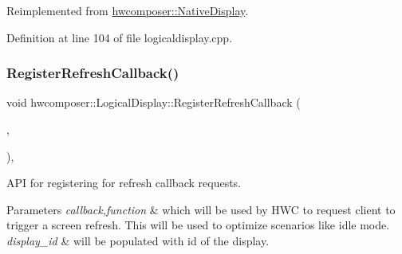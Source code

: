 Reimplemented from \mbox{\hyperlink{classhwcomposer_1_1NativeDisplay_a4080879c203571d6404ba3b3aff53631}{hwcomposer\+::\+Native\+Display}}.



Definition at line 104 of file logicaldisplay.\+cpp.


\begin{DoxyCode}{0}
\end{DoxyCode}
\mbox{\label{classhwcomposer_1_1LogicalDisplay_a53dd3b4a4ee95af6a903327519278691}} 
\subsubsection{\texorpdfstring{Register\+Refresh\+Callback()}{RegisterRefreshCallback()}}
{\footnotesize\ttfamily void hwcomposer\+::\+Logical\+Display\+::\+Register\+Refresh\+Callback (\begin{DoxyParamCaption}\item[{std\+::shared\+\_\+ptr$<$ \mbox{\hyperlink{classhwcomposer_1_1RefreshCallback}{Refresh\+Callback}} $>$}]{,  }\item[{uint32\+\_\+t}]{ }\end{DoxyParamCaption})\hspace{0.3cm}{\ttfamily [override]}, {\ttfamily [virtual]}}

A\+PI for registering for refresh callback requests. 
\begin{DoxyParams}{Parameters}
{\em callback,function} & which will be used by H\+WC to request client to trigger a screen refresh. This will be used to optimize scenarios like idle mode. \\
\hline
{\em display\+\_\+id} & will be populated with id of the display. \\
\hline
\end{DoxyParams}


